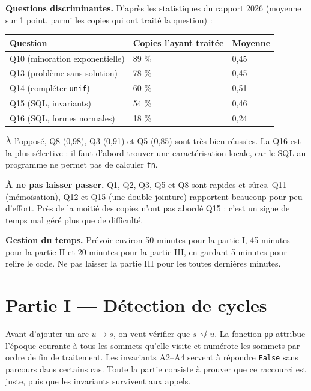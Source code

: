 \documentclass[11pt,a4paper]{article}
\begin{document}
\textbf{Questions discriminantes.} D'après les statistiques du rapport 2026 (moyenne sur 1 point, parmi les copies qui ont traité la question) :

\begin{longtable}[]{@{}lll@{}}
\toprule\noalign{}
Question & Copies l'ayant traitée & Moyenne \\
\midrule\noalign{}
\endhead
\bottomrule\noalign{}
\endlastfoot
Q10 (minoration exponentielle) & 89 \% & 0,45 \\
Q13 (problème sans solution) & 78 \% & 0,45 \\
Q14 (compléter \texttt{unif}) & 60 \% & 0,51 \\
Q15 (SQL, invariants) & 54 \% & 0,46 \\
Q16 (SQL, formes normales) & 18 \% & 0,24 \\
\end{longtable}

À l'opposé, Q8 (0,98), Q3 (0,91) et Q5 (0,85) sont très bien réussies. La Q16 est la plus sélective : il faut d'abord trouver une caractérisation locale, car le SQL au programme ne permet pas de calculer \texttt{fn}.

\textbf{À ne pas laisser passer.} Q1, Q2, Q3, Q5 et Q8 sont rapides et sûres. Q11 (mémoïsation), Q12 et Q15 (une double jointure) rapportent beaucoup pour peu d'effort. Près de la moitié des copies n'ont pas abordé Q15 : c'est un signe de temps mal géré plus que de difficulté.

\textbf{Gestion du temps.} Prévoir environ 50 minutes pour la partie I, 45 minutes pour la partie II et 20 minutes pour la partie III, en gardant 5 minutes pour relire le code. Ne pas laisser la partie III pour les toutes dernières minutes.

\hypertarget{partie-i-duxe9tection-de-cycles}{%
\section{Partie I --- Détection de cycles}\label{partie-i-duxe9tection-de-cycles}}

Avant d'ajouter un arc \(u\to s\), on veut vérifier que \(s\not\rightsquigarrow u\). La fonction \texttt{pp} attribue l'époque courante à tous les sommets qu'elle visite et numérote les sommets par ordre de fin de traitement. Les invariants A2--A4 servent à répondre \texttt{False} sans parcours dans certains cas. Toute la partie consiste à prouver que ce raccourci est juste, puis que les invariants survivent aux appels.
\end{document}
